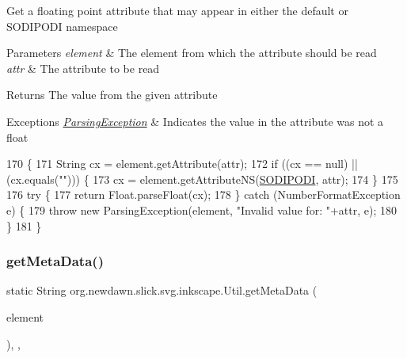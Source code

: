 Get a floating point attribute that may appear in either the default or S\+O\+D\+I\+P\+O\+DI namespace


\begin{DoxyParams}{Parameters}
{\em element} & The element from which the attribute should be read \\
\hline
{\em attr} & The attribute to be read \\
\hline
\end{DoxyParams}
\begin{DoxyReturn}{Returns}
The value from the given attribute 
\end{DoxyReturn}

\begin{DoxyExceptions}{Exceptions}
{\em \mbox{\hyperlink{classorg_1_1newdawn_1_1slick_1_1svg_1_1_parsing_exception}{Parsing\+Exception}}} & Indicates the value in the attribute was not a float \\
\hline
\end{DoxyExceptions}

\begin{DoxyCode}
170                                                                                          \{
171         String cx = element.getAttribute(attr);
172         \textcolor{keywordflow}{if} ((cx == null) || (cx.equals(\textcolor{stringliteral}{""}))) \{
173             cx = element.getAttributeNS(\mbox{\hyperlink{classorg_1_1newdawn_1_1slick_1_1svg_1_1inkscape_1_1_util_ae8d1dafc96d1e9a111de141dcc6f6d6f}{SODIPODI}}, attr);
174         \}
175         
176         \textcolor{keywordflow}{try} \{
177             \textcolor{keywordflow}{return} Float.parseFloat(cx);
178         \} \textcolor{keywordflow}{catch} (NumberFormatException e) \{
179             \textcolor{keywordflow}{throw} \textcolor{keyword}{new} ParsingException(element, \textcolor{stringliteral}{"Invalid value for: "}+attr, e);
180         \}
181     \}
\end{DoxyCode}
\mbox{\label{classorg_1_1newdawn_1_1slick_1_1svg_1_1inkscape_1_1_util_a93a7132a1178ccfeb1341987b00ef513}} 
\subsubsection{\texorpdfstring{get\+Meta\+Data()}{getMetaData()}}
{\footnotesize\ttfamily static String org.\+newdawn.\+slick.\+svg.\+inkscape.\+Util.\+get\+Meta\+Data (\begin{DoxyParamCaption}\item[{Element}]{element }\end{DoxyParamCaption})\hspace{0.3cm}{\ttfamily [inline]}, {\ttfamily [static]}, {\ttfamily [package]}}

